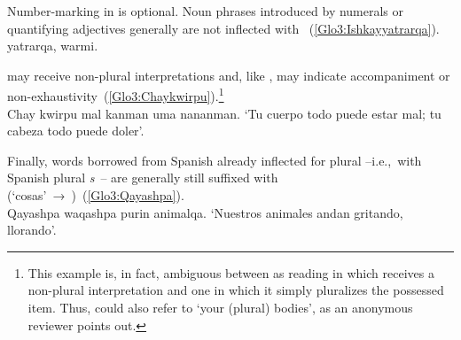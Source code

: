 \noindent
Number-marking in \SYQ{} is optional. Noun phrases introduced by numerals or quantifying adjectives generally are not inflected with ~(\ref{Glo3:Ishkayyatrarqa}).\\

%
{ yatrarqa,  warmi.}%
{}%
{}{}%

\noindent
{} may receive non-plural interpretations and, like , may indicate accompaniment or non-exhaustivity~(\ref{Glo3:Chaykwirpu}).\footnote{This example is, in fact, ambiguous between as reading in which  receives a non-plural interpretation and one in which it simply pluralizes the possessed item. Thus,  could also refer to ‘your (plural) bodies’, as an anonymous reviewer points out.}\\

%
{Chay kwirpu mal kanman uma nananman.}%
{}%
{‘Tu cuerpo todo puede estar mal; tu cabeza todo puede doler’.}%
{}{}%

\noindent
Finally, words borrowed from Spanish already inflected for plural --i.e.,~with Spanish plural \textit{s}~-- are generally still suffixed with  (‘cosas’~→~)~(\ref{Glo3:Qayashpa}).\\

%
{Qayashpa waqashpa purin animalqa.}%
{}%
{‘Nuestros animales andan gritando, llorando’.}%
{}{}%

